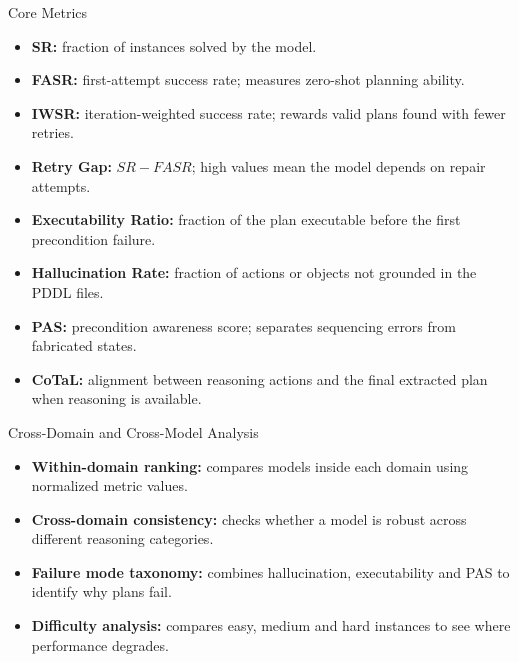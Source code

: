 \documentclass{beamer}
\begin{document}
\begin{frame}{Core Metrics}\footnotesize
    \begin{itemize}
        \item \textbf{SR:} fraction of instances solved by the model.
        \item \textbf{FASR:} first-attempt success rate; measures zero-shot planning ability.
        \item \textbf{IWSR:} iteration-weighted success rate; rewards valid plans found with fewer retries.
        \item \textbf{Retry Gap:} $SR - FASR$; high values mean the model depends on repair attempts.
        \item \textbf{Executability Ratio:} fraction of the plan executable before the first precondition failure.
        \item \textbf{Hallucination Rate:} fraction of actions or objects not grounded in the PDDL files.
        \item \textbf{PAS:} precondition awareness score; separates sequencing errors from fabricated states.
        \item \textbf{CoTaL:} alignment between reasoning actions and the final extracted plan when reasoning is available.
    \end{itemize}
\end{frame}


\begin{frame}{Cross-Domain and Cross-Model Analysis}\footnotesize
    \begin{itemize}
        \item \textbf{Within-domain ranking:} compares models inside each domain using normalized metric values.
        \item \textbf{Cross-domain consistency:} checks whether a model is robust across different reasoning categories.
        \item \textbf{Failure mode taxonomy:} combines hallucination, executability and PAS to identify why plans fail.
        \item \textbf{Difficulty analysis:} compares easy, medium and hard instances to see where performance degrades.
    \end{itemize}

\end{frame}
\end{document}

